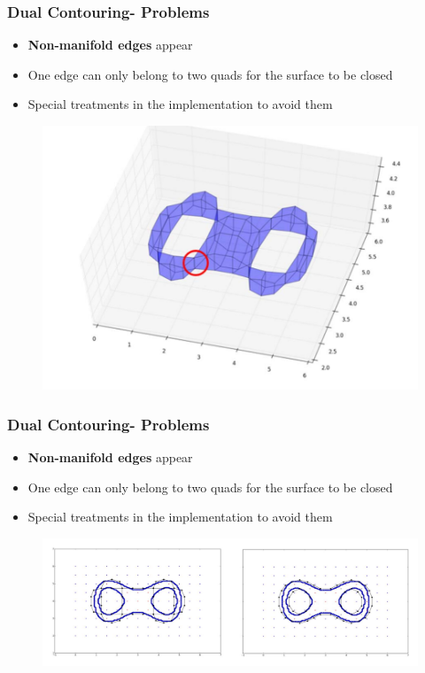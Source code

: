 \begin{frame}

	\frametitle{Dual Contouring- Problems}
	
	\begin{itemize}
	\item  \textbf{Non-manifold edges} appear
	\item One edge can only belong to two quads for the surface to be closed
	\item Special treatments in the implementation to avoid them
	\end{itemize}
	\begin{figure}
	\includegraphics[scale=0.35]{Pictures/DC/manifolds.pdf}
	\end{figure}
	
\end{frame}

\begin{frame}

	\frametitle{Dual Contouring- Problems}
	
	\begin{itemize}
	\item  \textbf{Non-manifold edges} appear
	\item One edge can only belong to two quads for the surface to be closed
	\item Special treatments in the implementation to avoid them
	\end{itemize}
	\begin{figure}
	\includegraphics[scale=0.35]{Pictures/DC/DC_3.pdf}
	\end{figure}
	
\end{frame}

